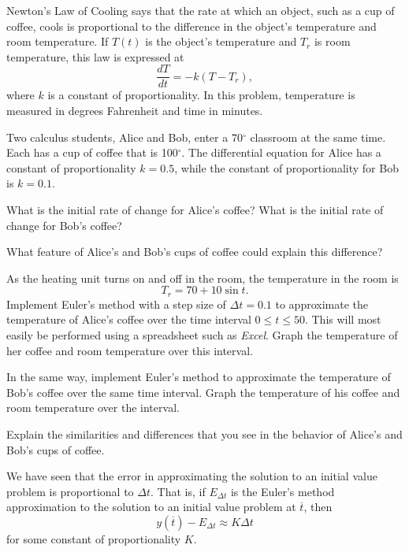 \begin{exercises} 
  \item  Newton's Law of Cooling says that the rate at which an
    object, such as a cup of coffee, cools is proportional to the
    difference in the object's temperature and room temperature.  If
    $T(t)$ is the object's temperature and $T_r$ is room temperature,
    this law is expressed at
    $$
    \frac{dT}{dt} = -k(T-T_r),
    $$
    where $k$ is a constant of proportionality.  In this problem,
    temperature is 
    measured in degrees Fahrenheit and time in minutes.

    \ba
    \item  Two calculus students, Alice and Bob, enter a 70$^\circ$
    classroom at the same time.  Each has a cup of coffee that is
    100$^\circ$.  The differential equation for Alice has a constant
    of proportionality $k=0.5$, while the constant of proportionality
    for Bob is $k=0.1$.

    What is the initial rate of change for Alice's coffee? 
    What is the initial rate of change for Bob's coffee?

    \item  What feature of Alice's and Bob's cups of coffee could explain
    this difference?

 \item  As the heating unit turns on and off in the room, the
    temperature in the room is $$T_r=70+10\sin t.$$  Implement Euler's
    method with a step size of $\Delta t = 0.1$ to approximate the
    temperature of Alice's coffee over the time interval $0\leq t\leq
    50$.  This will most easily be performed using a spreadsheet such
    as \emph{Excel}.  Graph the temperature of her coffee and room
    temperature over this interval.

   \item  In the same way, implement Euler's method to approximate the
    temperature of Bob's
    coffee over the same time interval.  Graph the temperature of his
    coffee and room temperature over the interval.

    \item  Explain the similarities and differences that you see in the
    behavior of Alice's and Bob's cups of coffee.
\ea

  \item We have seen that the error in approximating the solution to
    an initial value problem is proportional to $\Delta t$.  That is,
    if $E_{\Delta t}$ is the Euler's method approximation to the
    solution to an initial value problem at $\overline{t}$, then
    $$y(\overline{t})-E_{\Delta t} \approx K\Delta t
    $$
    for some constant of proportionality $K$.


\end{exercises}
